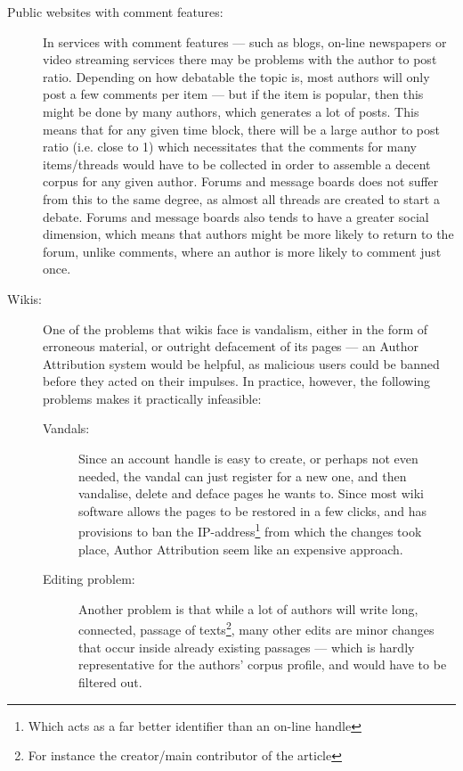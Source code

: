 \begin{description}
\item[Public websites with comment features:] In services with comment features --- such as blogs, on-line newspapers or video streaming services there may be problems with the author to post ratio. Depending on how debatable the topic is, most authors will only post a few comments per item --- but if the item is popular, then this might be done by many authors, which generates a lot of posts. This means that for any given time block, there will be a large author to post ratio (i.e. close to 1) which necessitates that the comments for many items/threads would have to be collected in order to assemble a decent corpus for any given author. Forums and message boards does not suffer from this to the same degree, as almost all threads are created to start a debate. Forums and message boards also tends to have a greater social dimension, which means that authors might be more likely to return to the forum, unlike comments, where an author is more likely to comment just once.

\item[Wikis:] One of the problems that wikis face is vandalism, either in the form of erroneous material, or outright defacement of its pages --- an Author Attribution system would be helpful, as malicious users could be banned before they acted on their impulses. In practice, however, the following problems makes it practically infeasible:
\begin{description}
\item[Vandals:] Since an account handle is easy to create, or perhaps not even needed, the vandal can just register for a new one, and then vandalise, delete and deface pages he wants to. Since most wiki software allows the pages to be restored in a few clicks, and has provisions to ban the IP-address\footnote{Which acts as a far better identifier than an on-line handle} from which the changes took place, Author Attribution seem like an expensive approach.  

\item[Editing problem:] Another problem is that while a lot of authors will write long, connected, passage of texts\footnote{For instance the creator/main contributor of the article}, many other edits are minor changes that occur inside already existing passages --- which is hardly representative for the authors' corpus profile, and would have to be filtered out.   
\end{description} 
\end{description}

